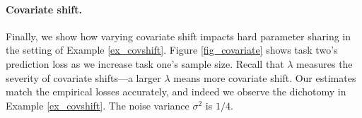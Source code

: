 \paragraph{Covariate shift.}
Finally, we show how varying covariate shift impacts hard parameter sharing in the setting of Example \ref{ex_covshift}. 
Figure \ref{fig_covariate} shows task two's prediction loss as we increase task one's sample size.
Recall that $\lambda$ measures the severity of covariate shifts---a larger $\lambda$ means more covariate shift.
Our estimates match the empirical losses accurately, and indeed we observe the dichotomy in Example \ref{ex_covshift}.
The noise variance $\sigma^2$ is $1/4$.



